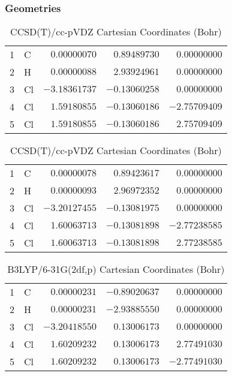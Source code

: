 \documentclass[10pt,oneside]{article}
\begin{document}
\begin{table}[h!]
\subsubsection*{Geometries}
\begin{multicols}{2}
\centering
\caption{CCSD(T)/cc-pVTZ Cartesian Coordinates (Bohr)}
\begin{tabular}{llrrr}
\toprule
1  & C  & $ 0.00000070$ & $ 0.89489730$ & $ 0.00000000$ \\
2  & H  & $ 0.00000088$ & $ 2.93924961$ & $ 0.00000000$ \\
3  & Cl & $-3.18361737$ & $-0.13060258$ & $ 0.00000000$ \\
4  & Cl & $ 1.59180855$ & $-0.13060186$ & $-2.75709409$ \\
5  & Cl & $ 1.59180855$ & $-0.13060186$ & $ 2.75709409$ \\
\bottomrule
\end{tabular}
\caption{CCSD(T)/cc-pVDZ Cartesian Coordinates (Bohr)}
\begin{tabular}{llrrr}
\toprule
1  & C  & $ 0.00000078$ & $ 0.89423617$ & $ 0.00000000$ \\
2  & H  & $ 0.00000093$ & $ 2.96972352$ & $ 0.00000000$ \\
3  & Cl & $-3.20127455$ & $-0.13081975$ & $ 0.00000000$ \\
4  & Cl & $ 1.60063713$ & $-0.13081898$ & $-2.77238585$ \\
5  & Cl & $ 1.60063713$ & $-0.13081898$ & $ 2.77238585$ \\
\bottomrule
\end{tabular}
\end{multicols}
\end{table}

\begin{table}[h]
\centering
\caption{B3LYP/6-31G(2df,p) Cartesian Coordinates (Bohr)}
\begin{tabular}{llrrr}
\toprule
1  & C  & $ 0.00000231$ & $-0.89020637$ & $ 0.00000000$ \\
2  & H  & $ 0.00000231$ & $-2.93885550$ & $ 0.00000000$ \\
3  & Cl & $-3.20418550$ & $ 0.13006173$ & $ 0.00000000$ \\
4  & Cl & $ 1.60209232$ & $ 0.13006173$ & $ 2.77491030$ \\
5  & Cl & $ 1.60209232$ & $ 0.13006173$ & $-2.77491030$ \\
\bottomrule
\end{tabular}
\end{table}
\end{document}

